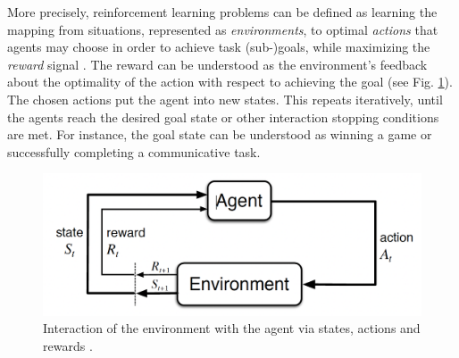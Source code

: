 More precisely, reinforcement learning problems can be defined as learning the mapping from situations, represented as \textit{environments}, to optimal \textit{actions} that agents may choose in order to achieve task (sub-)goals, while maximizing the \textit{reward} signal \parencite{sutton2018reinforcement}. The reward can be understood as the environment's feedback about the optimality of the action with respect to achieving the goal (see Fig. \ref{fig:rl}). The chosen actions put the agent into new states. This repeats iteratively, until the agents reach the desired goal state or other interaction stopping conditions are met. For instance, the goal state can be understood as winning a game or successfully completing a communicative task. 

\begin{figure}
	\centering
	\includegraphics[width=0.8\linewidth]{images/rl_intro.png}
	\caption{Interaction of the environment with the agent via states, actions and rewards \parencite[][p. 48]{sutton2018reinforcement}.}
	\label{fig:rl}
\end{figure}

